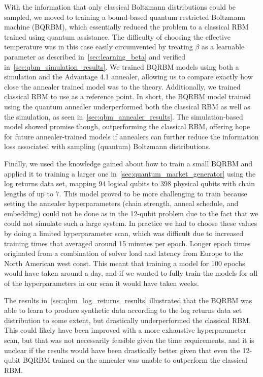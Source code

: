 With the information that only classical Boltzmann distributions could be sampled, we moved to training a bound-based quantum restricted Boltzmann machine (BQRBM), which essentially reduced the problem to a classical RBM trained using quantum assistance.
The difficulty of choosing the effective temperature was in this case easily circumvented by treating \( \beta \) as a learnable parameter as described in~\cref{sec:learning_beta} and verified in~\cref{sec:qbm_simulation_results}.
We trained BQRBM models using both a simulation and the Advantage 4.1 annealer, allowing us to compare exactly how close the annealer trained model was to the theory.
Additionally, we trained classical RBM to use as a reference point.
In short, the BQRBM model trained using the quantum annealer underperformed both the classical RBM as well as the simulation, as seen in~\cref{sec:qbm_annealer_results}.
The simulation-based model showed promise though, outperforming the classical RBM, offering hope for future annealer-trained models if annealers can further reduce the information loss associated with sampling (quantum) Boltzmann distributions.

Finally, we used the knowledge gained about how to train a small BQRBM and applied it to training a larger one in~\cref{sec:quantum_market_generator} using the log returns data set, mapping 94 logical qubits to 398 physical qubits with chain lengths of up to 7.
This model proved to be more challenging to train because setting the annealer hyperparameters (chain strength, anneal schedule, and embedding) could not be done as in the 12-qubit problem due to the fact that we could not simulate such a large system.
In practice we had to choose these values by doing a limited hyperparameter scan, which was difficult due to increased training times that averaged around 15 minutes per epoch.
Longer epoch times originated from a combination of solver load and latency from Europe to the North American west coast.
This meant that training a model for 100 epochs would have taken around a day, and if we wanted to fully train the models for all of the hyperparameters in our scan it would have taken weeks.

The results in~\cref{sec:qbm_log_returns_results} illustrated that the BQRBM was able to learn to produce synthetic data according to the log returns data set distribution to some extent, but drastically underperformed the classical RBM.
This could likely have been improved with a more exhaustive hyperparameter scan, but that was not necessarily feasible given the time requirements, and it is unclear if the results would have been drastically better given that even the 12-qubit BQRBM trained on the annealer was unable to outperform the classical RBM.

